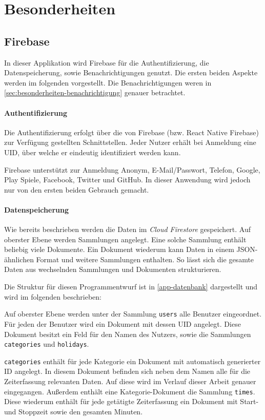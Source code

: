 \section{Besonderheiten}
\subsection{Firebase}
In dieser Applikation wird Firebase für die Authentifizierung,
die Datenspeicherung, sowie Benachrichtigungen genutzt.
Die ersten beiden Aspekte werden im folgenden vorgestellt.
Die Benachrichtigungen weren in \autoref{sec:besonderheiten-benachrichtigung} genauer betrachtet.

\paragraph{Authentifizierung}
Die Authentifizierung erfolgt über die von Firebase (bzw. React Native Firebase) zur Verfügung gestellten Schnittstellen.
Jeder Nutzer erhält bei Anmeldung eine UID, über welche er eindeutig identifiziert werden kann.

Firebase unterstützt zur Anmeldung Anonym, E-Mail/Passwort, Telefon, Google, Play Spiele, Facebook, Twitter und GitHub.
In dieser Anwendung wird jedoch nur von den ersten beiden Gebrauch gemacht.



\paragraph{Datenspeicherung}
Wie bereits beschrieben werden die Daten im \textit{Cloud Firestore} gespeichert.
Auf oberster Ebene werden Sammlungen angelegt.
Eine solche Sammlung enthält beliebig viele Dokumente.
Ein Dokument wiederum kann Daten in einem JSON-ähnlichen Format und weitere Sammlungen enthalten.
So lässt sich die gesamte Daten aus wechselnden Sammlungen und Dokumenten strukturieren.

Die Struktur für diesen Programmentwurf ist in \autoref{app-datenbank} dargestellt und wird im folgenden beschrieben:

Auf oberster Ebene werden unter der Sammlung \texttt{users} alle Benutzer eingeordnet.
Für jeden der Benutzer wird ein Dokument mit dessen UID angelegt.
Diese Dokument besitzt ein Feld für den Namen des Nutzers,
sowie die Sammlungen \texttt{categories} und \texttt{holidays}.

\texttt{categories} enthält für jede Kategorie ein Dokument mit automatisch generierter ID angelegt.
In diesem Dokument befinden sich neben dem Namen alle für die Zeiterfassung relevanten Daten.
Auf diese wird im Verlauf dieser Arbeit genauer eingegangen.
Außerdem enthält eine Kategorie-Dokument die Sammlung \texttt{times}.
Diese wiederum enthält für jede getätigte Zeiterfassung ein Dokument mit Start- und Stoppzeit sowie den gesamten Minuten.


